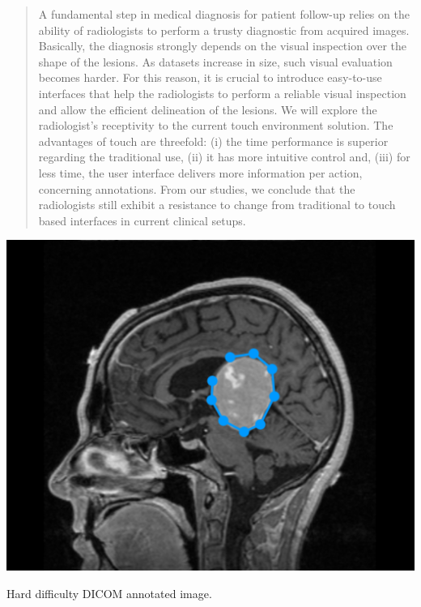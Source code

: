 \documentclass[sigchi-a, authorversion]{acmart}
\begin{document}


\begin{abstract}

A fundamental step in medical diagnosis for patient follow-up relies on the ability of radiologists to perform a trusty diagnostic from acquired images. Basically, the diagnosis strongly depends on the visual inspection over the shape of the lesions. As datasets increase in size, such visual evaluation becomes harder. For this reason, it is crucial to introduce easy-to-use interfaces that help the radiologists to perform a reliable visual inspection and allow the efficient delineation of the lesions. We will explore the radiologist's receptivity to the current touch environment solution. The advantages of touch are threefold: (i) the time performance is superior regarding the traditional use, (ii) it has more intuitive control and, (iii) for less time, the user interface delivers more information per action, concerning annotations. From our studies, we conclude that the radiologists still exhibit a resistance to change from traditional to touch based interfaces in current clinical setups.


\end{abstract}


\maketitle

\begin{marginfigure}
\includegraphics[width=\marginparwidth]{screen2.png}
\caption{Hard difficulty DICOM annotated image.}
\label{fig:Fig4}
\end{marginfigure}
\end{document}
